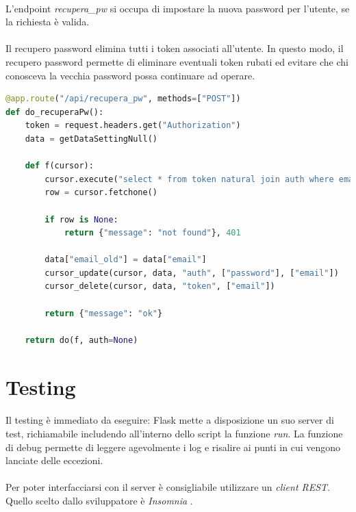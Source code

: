 \documentclass[12pt,a4paper,twoside,english,italian]{book}
\begin{document}
\paragraph{} L'endpoint \emph{recupera\_pw} si occupa di impostare la nuova password per l'utente, se la richiesta è valida.

\paragraph{} Il recupero password elimina tutti i token associati all'utente. In questo modo, il recupero password permette di eliminare eventuali token rubati ed evitare che chi conosceva la vecchia password possa continuare ad operare. 

\begin{lstlisting}[language=Python, caption=POST recupera\_pw]
@app.route("/api/recupera_pw", methods=["POST"])
def do_recuperaPw():
    token = request.headers.get("Authorization")
    data = getDataSettingNull()

    def f(cursor):
        cursor.execute("select * from token natural join auth where email=%s and token=%s", (data["email"], token))
        row = cursor.fetchone()

        if row is None:
            return {"message": "not found"}, 401

        data["email_old"] = data["email"]
        cursor_update(cursor, data, "auth", ["password"], ["email"])
        cursor_delete(cursor, data, "token", ["email"])

        return {"message": "ok"}

    return do(f, auth=None)
\end{lstlisting}


\section{Testing}

\paragraph{} Il testing è immediato da eseguire: Flask mette a disposizione un suo server di test, richiamabile includendo all'interno dello script la funzione \emph{run}. La funzione di debug permette di leggere agevolmente i log e risalire ai punti in cui vengono lanciate delle eccezioni.

\paragraph{} Per poter interfacciarsi con il server è consigliabile utilizzare un \emph{client REST}. Quello scelto dallo sviluppatore è \emph{Insomnia} \cite{insomnia}.
\end{document}
